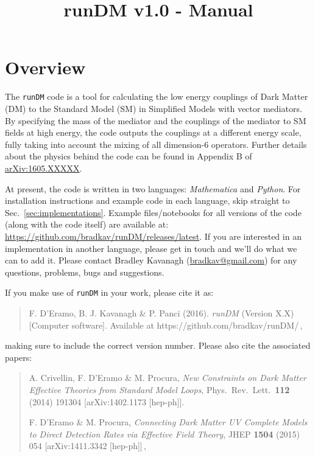 \documentclass[notitlepage,12pt]{article}
\newcommand{\runDM}{\texttt{runDM}\xspace}
\begin{document}
\title{runDM v1.0 - Manual}
\maketitle

\tableofcontents

\section{Overview}

The \runDM code is a tool for calculating the low energy couplings of Dark Matter (DM) to the Standard Model (SM) in Simplified Models with vector mediators. By specifying the mass of the mediator and the couplings of the mediator to SM fields at high energy, the code outputs the couplings at a different energy scale, fully taking into account the mixing of all dimension-6 operators. Further details about the physics behind the code can be found in Appendix B of \href{http://arxiv.org/abs/1605.XXXXX}{arXiv:1605.XXXXX}.

At present, the code is written in two languages: \textit{Mathematica} and \textit{Python}. For installation instructions and example code in each language, skip straight to Sec.~\ref{sec:implementations}. Example files/notebooks for all versions of the code (along with the code itself) are available at: \href{https://github.com/bradkav/runDM/releases/latest}{https://github.com/bradkav/runDM/releases/latest}. If you are interested in an implementation in another language, please get in touch and we'll do what we can to add it. Please contact Bradley Kavanagh (\href{mailto:bradkav@gmail.com?subject=runDM v.10}{bradkav@gmail.com}) for any questions, problems, bugs and suggestions.

If you make use of \runDM in your work, please cite it as:

\begin{quote}
F. D'Eramo, B. J. Kavanagh \& P. Panci (2016). \textit{runDM} (Version X.X) [Computer software]. Available at https://github.com/bradkav/runDM/\,,
\end{quote}
making sure to include the correct version number. Please also cite the associated papers:

\begin{quote}

 A. Crivellin, F. D'Eramo \& M. Procura, \textit{New Constraints on Dark Matter Effective Theories from Standard Model Loops}, Phys.\ Rev.\ Lett.\  {\bf 112} (2014) 191304 [arXiv:1402.1173 [hep-ph]].

F. D'Eramo \& M. Procura, \textit{Connecting Dark Matter UV Complete Models to Direct Detection Rates via Effective Field Theory}, JHEP {\bf 1504} (2015) 054 [arXiv:1411.3342 [hep-ph]]\,,
\end{quote}
\end{document}
